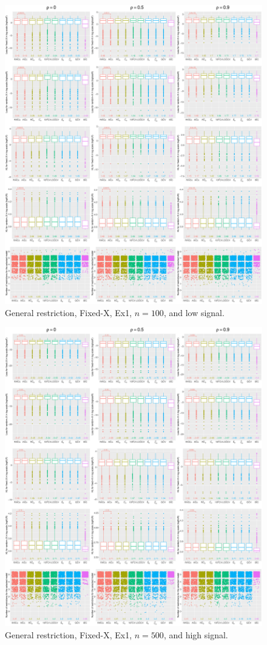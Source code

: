 \begin{figure}[!ht]
\centering
\includegraphics[width=\textwidth]{figures/supplement/fixedx/general_restriction/Ex1_n100_lsnr.eps}
\caption{General restriction, Fixed-X, Ex1, $n=100$, and low signal.}
\end{figure}
\clearpage
\begin{figure}[!ht]
\centering
\includegraphics[width=\textwidth]{figures/supplement/fixedx/general_restriction/Ex1_n500_hsnr.eps}
\caption{General restriction, Fixed-X, Ex1, $n=500$, and high signal.}
\end{figure}
